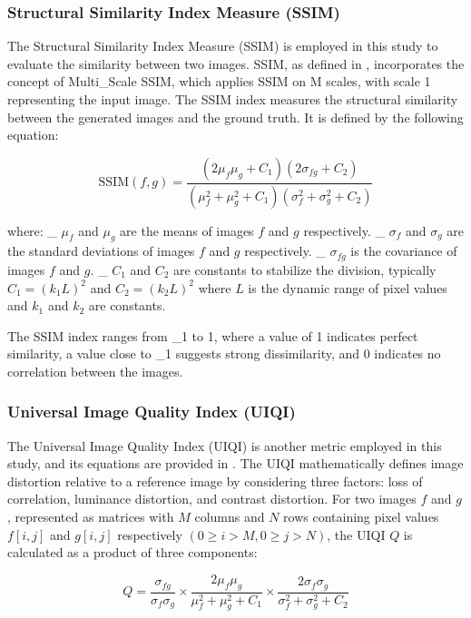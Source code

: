 \subsubsection{Structural Similarity Index Measure (SSIM)}

The Structural Similarity Index Measure (SSIM) is employed in this study to evaluate the similarity between two images. SSIM, as defined in \cite{wang2003multiscale}, incorporates the concept of Multi_Scale SSIM, which applies SSIM on M scales, with scale 1 representing the input image. The SSIM index measures the structural similarity between the generated images and the ground truth. It is defined by the following equation:

\begin{equation}
    \text{SSIM}(f, g) = \frac{(2\mu_{f}\mu_{g} + C_1)(2\sigma_{fg} + C_2)}{(\mu_{f}^2 + \mu_{g}^2 + C_1)(\sigma_{f}^2 + \sigma_{g}^2 + C_2)}
\end{equation}

where:
_ $\mu_{f}$ and $\mu_{g}$ are the means of images $f$ and $g$ respectively.
_ $\sigma_{f}$ and $\sigma_{g}$ are the standard deviations of images $f$ and $g$ respectively.
_ $\sigma_{fg}$ is the covariance of images $f$ and $g$.
_ $C_1$ and $C_2$ are constants to stabilize the division, typically $C_1 = (k_1L)^2$ and $C_2 = (k_2L)^2$ where $L$ is the dynamic range of pixel values and $k_1$ and $k_2$ are constants.

The SSIM index ranges from _1 to 1, where a value of 1 indicates perfect similarity, a value close to _1 suggests strong dissimilarity, and 0 indicates no correlation between the images.

\subsubsection{Universal Image Quality Index (UIQI)}
The Universal Image Quality Index (UIQI) is another metric employed in this study, and its equations are provided in \cite{universal_image_quality_index}. The UIQI mathematically defines image distortion relative to a reference image by considering three factors: loss of correlation, luminance distortion, and contrast distortion. For two images $f$ and $g$, represented as matrices with $M$ columns and $N$ rows containing pixel values $f[i,j]$ and $g[i,j]$ respectively $(0 \geq i > M, 0 \geq j > N)$, the UIQI $Q$ is calculated as a product of three components:

\begin{equation}
    Q = \frac{\sigma_{fg}}{\sigma_{f}\sigma_{g}} \times \frac{2\mu_{f}\mu_{g}}{\mu_{f}^2 + \mu_{g}^2 + C_1} \times \frac{2\sigma_{f}\sigma_{g}}{\sigma_{f}^2 + \sigma_{g}^2 + C_2}
\end{equation}

